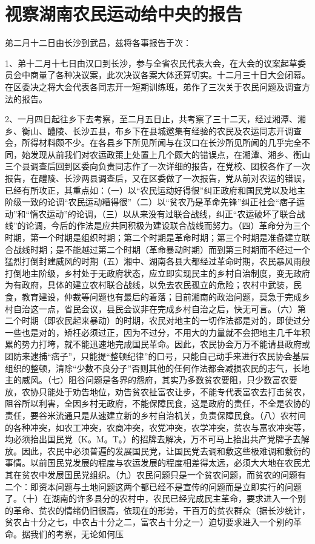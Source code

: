 \section[视察湖南农民运动给中央的报告（一九二七年二月一十六日）]{视察湖南农民运动给中央的报告}


弟二月十二日由长沙到武昌，兹将各事报告于次：

1、弟十二月十七日由汉口到长沙，参与全省农民代表大会，在大会的议案起草委员会中商量了各种决议案，此次决议各案大体还算切实。十二月三十日大会闭幕。在区委决之将大会代表各同志开一短期训练班，弟作了三次关于农民问题及调查方法的报告。

2、一月四日起往乡下去考察，至二月五日止，共考察了三十二天，经过湘潭、湘乡、衡山、醴陵、长沙五县，布乡下在县城邀集有经验的农民及农运同志开调查会，所得材料颇不少。在各县乡下所见所闻与在汉口在长沙所见所闻的几乎完全不同，始发现从前我们对农运政策上处置上几个颇大的错误点，在湘潭、湘乡、衡山三个县调查后回到区委向负责同志作了一次详细的报告，在党校、团校各作了一次报告，在醴陵、长沙两县调查后，又在区委做了一次报告，党从前对农运的错误，已经有所攻正，其重点如：（一）以“农民运动好得很”纠正政府和国民党以及地主阶级一致的论调“农民运动糟得很”（二）以“贫农乃是革命先锋”纠正社会“痞子运动”和“惰农运动”的论调，（三）以从来没有过联合战线，纠正“农运破坏了联合战线”的论调，今后的作法是应共同积极为建设联合战线而努力。（四）革命分为三个时期，第一个时期是组织时期；第二个时期是革命时期；第三个时期是准备建立联合战线时期；是不能越过第二个时期（革命暴动时期）而到第三时期而不经过一个猛烈打倒封建威风的时期（五）湘中、湖南各县大都经过革命时期，农民暴风雨般打倒地主阶级，乡村处于无政府状态，应立即实现民主的乡村自治制度，变无政府为有政府，具体的建立农村联合战线，以免去农民孤立的危险；农村中武装，民食，教育建设，仲裁等问题也有最后的着落；目前湘南的政治问题，莫急于完成乡村自治这一点，省民会议，县民会议非在完成乡村自治之后，快无可言。（六）第二个时期（即农民起来暴动）的时期，农民对地主的一切作法都是对的，即使过分一些也是对的，矫枉必须过正，因为不过分，不用大的力量就不会把地主几千年积累的势力打垮，就不能迅速地完成国民革命。因此，农民协会万万不能请县政府或团防来逮捕“痞子”，只能提“整顿纪律”的口号，只能自己动手来进行农民协会基层组织的整顿，清除“少数不良分子”否则其他的任何作法都会减损农民的志气，长地主的威风。（七）阻谷问题是各界的怨府，其实乃多数贫农要阻，只少数富农要放，农协只能处于劝告地位，劝告贫农扯富农让步，不能专代表富农去打击贫农，阻谷所以利害，全因乡村无政府，不能保障民食，这是政府的责任，不全是农协的责任，要谷米流通只是从速建立新的乡村自治机关，负责保障民食。（八）农村间的各种冲突，如农工冲突，农商冲突，农党冲突，农学冲突，贫农与富农冲突等，均必须抬出国民党（K。M。T。）的招牌去解决，万不可马上抬出共产党牌子去解放。因此，农民中必须普遍的发展国民党，让国民党去调和敷这些极难调和敷衍的事情。以前国民党发展的程度与农运发展的程度相差得太远，必须大大地在农民尤其在贫农中发展国民党组织。（九）农民问题只是一个贫农问题，而贫农的问题有二个：即资本问题与土地问题这两个都已经不是宣传的问题而是立即实行的问题了。（十）在湖南的许多县分的农村中，农民已经完成民主革命，要求进入一个别的革命、贫农的情绪仍旧很高，依现在的形势，干百万的贫农群众（据长沙统计，贫农占十分之七，中农占十分之二，富农占十分之一）迫切要求进入一个别的革命。据我们的考察，无论如何压